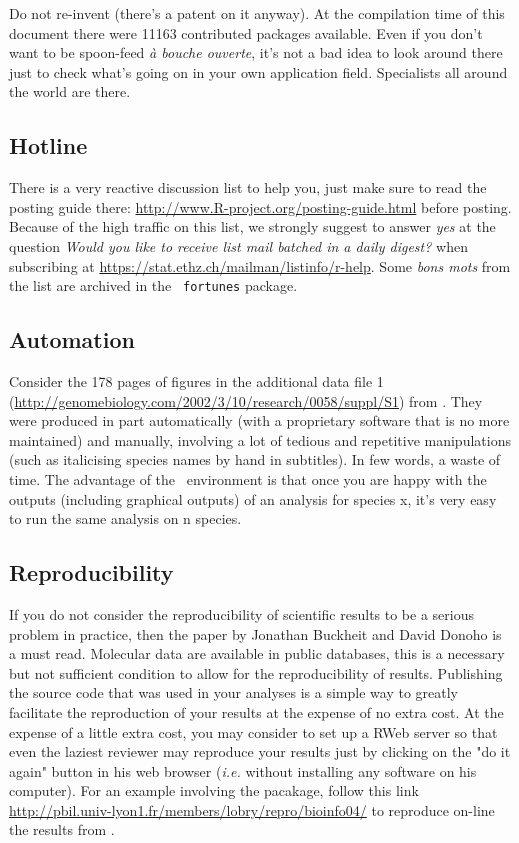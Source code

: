 \documentclass{article}
\begin{document}
Do not re-invent (there's a patent \cite{wheel} on it anyway).
At the compilation time of this document there were 
11163
contributed packages available. Even if you don't want to be spoon-feed 
\textit{{\`a} bouche ouverte}, 
it's not a bad
idea to look around there just to check what's going on in your own application field.
Specialists all around the world are there.

\subsection{Hotline}

There is a very reactive discussion list to help you, just make sure to
read the posting guide there: \url{http://www.R-project.org/posting-guide.html}
before posting. Because of the high traffic on this list, we strongly suggest to answer \emph{yes} at the
question \emph{Would you like to receive list mail batched in a daily  digest?} when
subscribing at \url{https://stat.ethz.ch/mailman/listinfo/r-help}. Some \textit{bons mots}
from the list are archived in the \Rlogo{}~\texttt{fortunes} package.

\subsection{Automation} 
Consider the 178 pages of figures in the additional data file 1
(\url{http://genomebiology.com/2002/3/10/research/0058/suppl/S1}) from \cite{lobrysueoka}. 
They were produced in part automatically (with a proprietary
software that is no more maintained) and manually, involving a lot of
tedious and repetitive manipulations (such as italicising species names by hand in subtitles).
In few words, a waste of time. The advantage of the \Rlogo{}~environment is that once you are
happy with the outputs (including graphical outputs) of an analysis for species x, it's very
easy to run the same analysis on n species. 

\subsection{Reproducibility} 
If you do not consider the reproducibility of scientific results
to be a serious problem in practice, then the paper by Jonathan Buckheit and David Donoho
\cite{repro} is a must read. Molecular data are available in public databases, this is
a necessary but not sufficient condition to allow for the reproducibility of results.
Publishing the \Rlogo{} source code that was used in your analyses is a simple way
to greatly facilitate the reproduction of your results at the expense of no extra cost. 
At the expense of a little extra cost, you may consider to set up a RWeb server
so that even the laziest reviewer may reproduce your results just by clicking on
the "do it again" button in his web browser (\textit{i.e.} without installing any
software on his computer). For an example involving the \seqinr{} pacakage, 
follow this link \url{http://pbil.univ-lyon1.fr/members/lobry/repro/bioinfo04/}
to reproduce on-line the results from \cite{fifine}.
\end{document}
